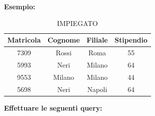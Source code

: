 \documentclass{article}
\begin{document}
\textbf{Esempio:}
\begin{table}[h!]
    \centering
    \begin{tabular}{|c|c|c|c|}
        \hline
        \textbf{Matricola} & \textbf{Cognome} & \textbf{Filiale} & \textbf{Stipendio} \\
        \hline
        7309 & Rossi & Roma & 55 \\
        \hline
        5993 & Neri & Milano & 64 \\
        \hline
        9553 & Milano & Milano & 44 \\
        \hline
        5698 & Neri & Napoli & 64 \\
        \hline
    \end{tabular}
    \caption{IMPIEGATO}
\end{table}

\textbf{Effettuare le seguenti query:}
\end{document}

